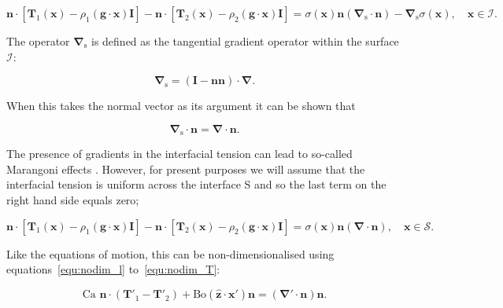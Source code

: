 \documentclass[12pt]{article}
\begin{document}
\begin{equation}
\label{equ:fluid_fluid_dyn}
\boldsymbol{n} \cdot [\boldsymbol{T}_{1} (\boldsymbol{x}) - \rho_{1}(\boldsymbol{g} \cdot \boldsymbol{x}) \boldsymbol{I}] - \boldsymbol{n} \cdot [\boldsymbol{T}_{2} (\boldsymbol{x}) - \rho_{2} (\boldsymbol{g} \cdot \boldsymbol{x}) \boldsymbol{I}] = \sigma(\boldsymbol{x}) \boldsymbol{n} (\boldsymbol{\nabla}_{\text{s}} \cdot \boldsymbol{n}) - \boldsymbol{\nabla}_{\text{s}} \sigma (\boldsymbol{x}) , \quad \boldsymbol{x} \in \mathcal{I} .
\end{equation}

The operator $\boldsymbol{\nabla}_{\text{s}}$ is defined as the tangential gradient operator within the surface $\mathcal{I}$:

\begin{equation}
\label{equ:surf_grad}
\boldsymbol{\nabla}_{\text{s}} = (\boldsymbol{I} - \boldsymbol{n} \boldsymbol{n}) \cdot \boldsymbol{\nabla} .
\end{equation}

When this takes the normal vector as its argument it can be shown that \citep{Brackbill92}

\begin{equation}
\label{equ:tang_diff_norm}
\boldsymbol{\nabla}_{\text{s}} \cdot \boldsymbol{n} = \boldsymbol{\nabla} \cdot \boldsymbol{n}.
\end{equation}

The presence of gradients in the interfacial tension can lead to so-called Marangoni effects \citep{Kim05}. However, for present purposes we will assume that the interfacial tension is uniform across the interface S and so the last term on the right hand side equals zero;

\begin{equation}
\label{equ:fluid_fluid_dyn_nograd}
\boldsymbol{n} \cdot [\boldsymbol{T}_{1} (\boldsymbol{x}) - \rho_{1} (\boldsymbol{g} \cdot \boldsymbol{x}) \boldsymbol{I}] - \boldsymbol{n} \cdot [\boldsymbol{T}_{2} (\boldsymbol{x}) - \rho_{2} (\boldsymbol{g} \cdot \boldsymbol{x}) \boldsymbol{I}] = \sigma(\boldsymbol{x}) \boldsymbol{n} (\boldsymbol{\nabla} \cdot \boldsymbol{n}),  \quad \boldsymbol{x} \in \mathcal{S}.
\end{equation}

Like the equations of motion, this can be non-dimensionalised using equations~\ref{equ:nodim_l} to~\ref{equ:nodim_T}:

\begin{equation}
\label{equ:nodim_fluid_fluid_dyn}
\text{Ca } \boldsymbol{n} \cdot (\boldsymbol{T'}_{1} - \boldsymbol{T'}_{2}) + \text{Bo}(\boldsymbol{\hat{z}} \cdot \boldsymbol{x'}) \boldsymbol{n} = (\boldsymbol{\nabla'} \cdot \boldsymbol{n}) \boldsymbol{n}.
\end{equation}
\end{document}
